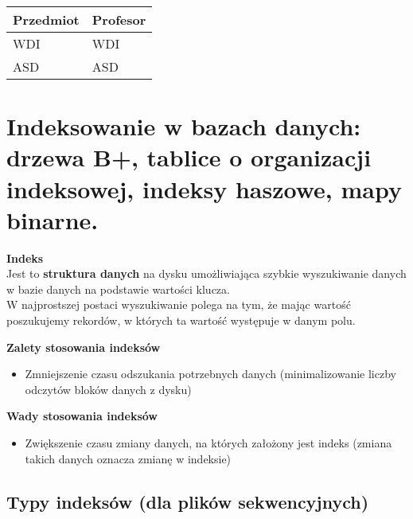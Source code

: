 \documentclass[main.tex]{subfiles}
\begin{document}
\begin{enumerate}
        \begin{table}[H]
            \begin{tabular}{|l|l|}
                \hline
                Przedmiot & Profesor \\ \hline
                WDI & WDI      \\ \hline
                ASD & ASD      \\ \hline
            \end{tabular}
        \end{table}


    \end{enumerate}

    \section{Indeksowanie w bazach danych: drzewa B+, tablice o organizacji indeksowej, indeksy haszowe, mapy binarne.}

    \begin{definition}
        \textbf{Indeks}\\
        Jest to \textbf{struktura danych} na dysku umożliwiająca szybkie wyszukiwanie danych w bazie danych na podstawie wartości klucza.\\

        W najprostszej postaci wyszukiwanie polega na tym, że mając wartość poszukujemy rekordów, w których ta wartość występuje w danym polu.
    \end{definition}

    \textbf{Zalety stosowania indeksów}\\
    \begin{itemize}
        \item Zmniejszenie czasu odszukania potrzebnych danych (minimalizowanie liczby odczytów bloków danych z dysku)
    \end{itemize}

    \textbf{Wady stosowania indeksów}\\
    \begin{itemize}
        \item Zwiększenie czasu zmiany danych, na których założony jest indeks (zmiana takich danych oznacza zmianę w indeksie)
    \end{itemize}

    \subsection{Typy indeksów (dla plików sekwencyjnych)}
\end{document}
